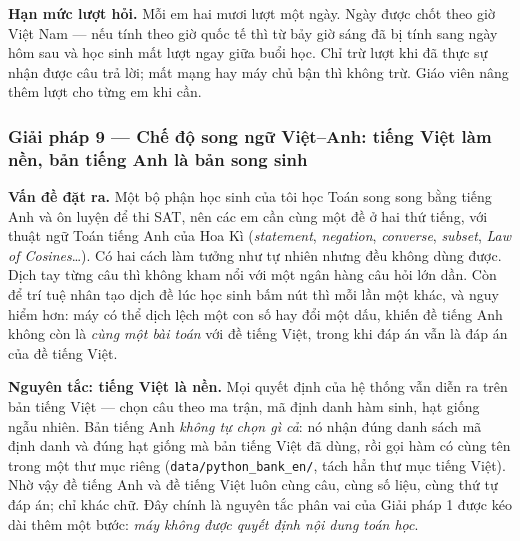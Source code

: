 \textbf{Hạn mức lượt hỏi.} Mỗi em hai mươi lượt một ngày. Ngày được chốt theo
giờ Việt Nam --- nếu tính theo giờ quốc tế thì từ bảy giờ sáng đã bị tính sang
ngày hôm sau và học sinh mất lượt ngay giữa buổi học. Chỉ trừ lượt khi đã thực
sự nhận được câu trả lời; mất mạng hay máy chủ bận thì không trừ. Giáo viên
nâng thêm lượt cho từng em khi cần.





\subsubsection{Giải pháp 9 --- Chế độ song ngữ Việt--Anh: tiếng Việt làm nền, bản tiếng Anh là bản song sinh}

\textbf{Vấn đề đặt ra.} Một bộ phận học sinh của tôi học Toán song song bằng
tiếng Anh và ôn luyện để thi SAT, nên các em cần cùng một đề ở hai thứ tiếng,
với thuật ngữ Toán tiếng Anh của Hoa Kì (\textit{statement}, \textit{negation},
\textit{converse}, \textit{subset}, \textit{Law of Cosines}\dots). Có hai cách
làm tưởng như tự nhiên nhưng đều không dùng được. Dịch tay từng câu thì không
kham nổi với một ngân hàng câu hỏi lớn dần. Còn để trí tuệ nhân tạo dịch đề lúc
học sinh bấm nút thì mỗi lần một khác, và nguy hiểm hơn: máy có thể dịch lệch
một con số hay đổi một dấu, khiến đề tiếng Anh không còn là \textit{cùng một
bài toán} với đề tiếng Việt, trong khi đáp án vẫn là đáp án của đề tiếng Việt.

\textbf{Nguyên tắc: tiếng Việt là nền.} Mọi quyết định của hệ thống vẫn diễn ra
trên bản tiếng Việt --- chọn câu theo ma trận, mã định danh hàm sinh, hạt giống
ngẫu nhiên. Bản tiếng Anh \textit{không tự chọn gì cả}: nó nhận đúng danh sách
mã định danh và đúng hạt giống mà bản tiếng Việt đã dùng, rồi gọi hàm có cùng
tên trong một thư mục riêng (\texttt{data/python\_bank\_en/}, tách hẳn thư mục
tiếng Việt). Nhờ vậy đề tiếng Anh và đề tiếng Việt luôn cùng câu, cùng số liệu,
cùng thứ tự đáp án; chỉ khác chữ. Đây chính là nguyên tắc phân vai của Giải
pháp 1 được kéo dài thêm một bước: \textit{máy không được quyết định nội dung
toán học}.

